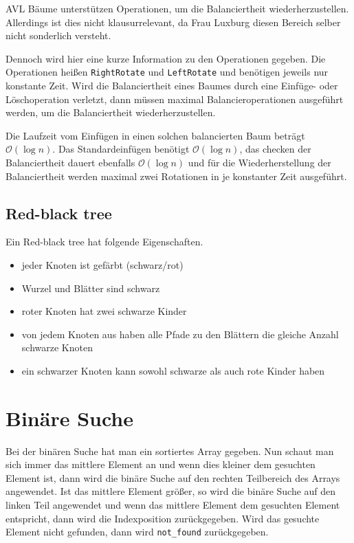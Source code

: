 \documentclass[10pt,a4paper,oneside,ngerman,numbers=noenddot]{scrartcl}
\begin{document}
		AVL Bäume unterstützen Operationen, um die Balanciertheit wiederherzustellen. Allerdings ist dies nicht klausurrelevant, da Frau Luxburg diesen Bereich selber nicht sonderlich versteht.
	
		Dennoch wird hier eine kurze Information zu den Operationen gegeben. Die Operationen heißen \texttt{RightRotate} und \texttt{LeftRotate} und benötigen jeweils nur konstante Zeit. Wird die Balanciertheit eines Baumes durch eine Einfüge- oder Löschoperation verletzt, dann müssen maximal Balancieroperationen ausgeführt werden, um die Balanciertheit wiederherzustellen.
	
		Die Laufzeit vom Einfügen in einen solchen balancierten Baum beträgt $\mathcal{O}(\log n)$. Das Standardeinfügen benötigt $\mathcal{O}(\log n)$, das checken der Balanciertheit dauert ebenfalls $\mathcal{O}(\log n)$ und für die Wiederherstellung der Balanciertheit werden maximal zwei Rotationen in je konstanter Zeit ausgeführt.
	
	\subsection{Red-black tree}
	
		Ein Red-black tree hat folgende Eigenschaften.
		
		\begin{itemize}
			\item jeder Knoten ist gefärbt (schwarz/rot)
			\item Wurzel und Blätter sind schwarz
			\item roter Knoten hat zwei schwarze Kinder
			\item von jedem Knoten aus haben alle Pfade zu den Blättern die gleiche Anzahl schwarze Knoten
			\item ein schwarzer Knoten kann sowohl schwarze als auch rote Kinder haben
		\end{itemize}
		
\section{Binäre Suche}

	Bei der binären Suche hat man ein sortiertes Array gegeben. Nun schaut man sich immer das mittlere Element an und wenn dies kleiner dem gesuchten Element ist, dann wird die binäre Suche auf den rechten Teilbereich des Arrays angewendet. Ist das mittlere Element größer, so wird die binäre Suche auf den linken Teil angewendet und wenn das mittlere Element dem gesuchten Element entspricht, dann wird die Indexposition zurückgegeben. Wird das gesuchte Element nicht gefunden, dann wird \texttt{not\_found} zurückgegeben.
	
\end{document}
